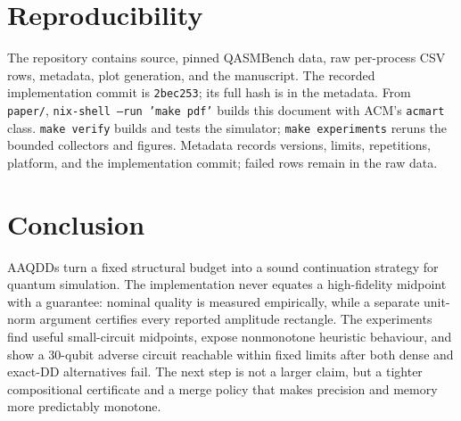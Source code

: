 \documentclass[sigconf,nonacm]{acmart}
\newcommand{\aaqdd}{AAQDD}
\begin{document}
\section{Reproducibility}

The repository contains source, pinned QASMBench data, raw per-process CSV rows, metadata,
plot generation, and the manuscript. The recorded implementation commit is \texttt{2bec253};
its full hash is in the metadata. From \texttt{paper/},
\texttt{nix-shell --run 'make pdf'} builds this document with ACM's \texttt{acmart} class.
\texttt{make verify} builds and tests the simulator; \texttt{make experiments} reruns the
bounded collectors and figures. Metadata records versions, limits, repetitions, platform,
and the implementation commit; failed rows remain in the raw data.

\section{Conclusion}

\aaqdd{}s turn a fixed structural budget into a sound continuation strategy for quantum
simulation. The implementation never equates a high-fidelity midpoint with a guarantee:
nominal quality is measured empirically, while a separate unit-norm argument certifies every
reported amplitude rectangle. The experiments find useful small-circuit midpoints, expose
nonmonotone heuristic behaviour, and show a 30-qubit adverse circuit reachable within fixed
limits after both dense and exact-DD alternatives fail. The next step is not a larger claim,
but a tighter compositional certificate and a merge policy that makes precision and memory
more predictably monotone.



\end{document}
